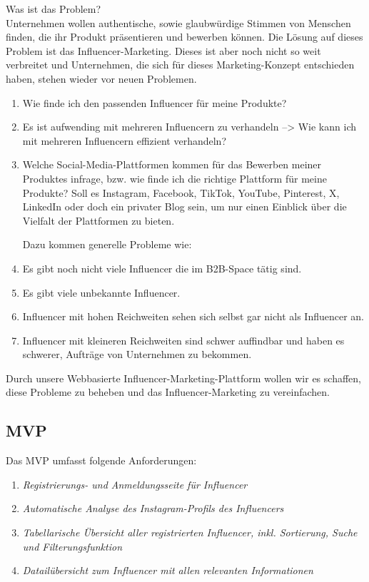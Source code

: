 \documentclass[conference,a4paper,flushend]{cs-techrep}
\begin{document}
Was ist das Problem?\\
Unternehmen wollen authentische, sowie glaubwürdige Stimmen von Menschen finden, die ihr Produkt präsentieren und bewerben können. Die Lösung auf dieses Problem ist das Influencer-Marketing. Dieses ist aber noch nicht so weit verbreitet und Unternehmen, die sich für dieses Marketing-Konzept entschieden haben, stehen wieder vor neuen Problemen.

\begin{enumerate}

\item{Wie finde ich den passenden Influencer für meine Produkte?}
\item{Es ist aufwending mit mehreren Influencern zu verhandeln --> Wie kann ich mit mehreren Influencern effizient verhandeln?}
\item{Welche Social-Media-Plattformen kommen für das Bewerben meiner Produktes infrage, bzw. wie finde ich die richtige Plattform für meine Produkte? Soll es Instagram, Facebook, TikTok, YouTube, Pinterest, X, LinkedIn oder doch ein privater Blog sein, um nur einen Einblick über die Vielfalt der Plattformen zu bieten. \\}

Dazu kommen generelle Probleme wie:

\item{Es gibt noch nicht viele Influencer die im B2B-Space tätig sind.}
\item{Es gibt viele unbekannte Influencer.}
\item{Influencer mit hohen Reichweiten sehen sich selbst gar nicht als Influencer an.}
\item{Influencer mit kleineren Reichweiten sind schwer auffindbar und haben es schwerer, Aufträge von Unternehmen zu bekommen.}

\end{enumerate}

Durch unsere Webbasierte Influencer-Marketing-Plattform wollen wir es schaffen, diese Probleme zu beheben und das Influencer-Marketing zu vereinfachen.

\subsection{MVP}
Das MVP umfasst folgende Anforderungen:
\begin{enumerate}
\item{\textit{Registrierungs- und Anmeldungsseite für Influencer}}
\item{\textit{Automatische Analyse des Instagram-Profils des Influencers}}
\item{\textit{Tabellarische Übersicht aller registrierten Influencer, inkl. Sortierung, Suche und Filterungsfunktion}}
\item{\textit{Datailübersicht zum Influencer mit allen relevanten Informationen}}
\end{enumerate}
\end{document}
